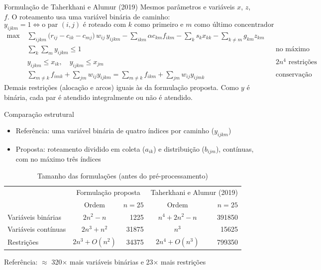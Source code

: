 \documentclass[aspectratio=169, 10pt]{beamer}
\begin{document}
\begin{frame}{Formulação de Taherkhani e Alumur (2019)}
  \small
  Mesmos parâmetros e variáveis $x$, $z$, $f$. O roteamento usa uma \alert{variável binária de caminho}:
  \[
    y_{ijkm} = 1 \iff \text{o par } (i,j) \text{ é roteado com } k \text{ como primeiro e } m \text{ como último concentrador}
  \]
  \vspace{-0.3cm}
  \scriptsize
  \begin{align*}
    \max\; & \textstyle\sum_{ijkm} \big(r_{ij} - c_{ik} - c_{mj}\big)\,w_{ij}\,y_{ijkm} - \sum_{ikm}\alpha c_{km}f_{ikm} - \sum_k s_kx_{kk} - \sum_{k\neq m} g_{km}z_{km}\\
    & \textstyle\sum_{k}\sum_m y_{ijkm}\le 1 && \text{no máximo um caminho por par}\\
    & y_{ijkm}\le x_{ik}, \quad y_{ijkm}\le x_{jm} && \text{$2n^4$ restrições}\\
    & \textstyle\sum_{m\neq k} f_{imk} + \sum_{jm} w_{ij}y_{ijkm} = \sum_{m\neq k} f_{ikm} + \sum_{jm} w_{ij}y_{ijmk} && \text{conservação de fluxo}
  \end{align*}
  \small
  \vspace{-0.2cm}
  Demais restrições (alocação e arcos) iguais às da formulação proposta. Como $y$ é binária, cada par é atendido \alert{integralmente ou não é atendido}.
\end{frame}

\begin{frame}{Comparação estrutural}
  \begin{itemize}
    \item Referência: \alert{uma variável binária de quatro índices} por caminho ($y_{ijkm}$)
    \item Proposta: roteamento dividido em coleta ($a_{ik}$) e distribuição ($b_{ijm}$), \alert{contínuas}, com no máximo três índices
  \end{itemize}

  \begin{table}
    \centering
    \footnotesize
    \caption{Tamanho das formulações (antes do pré-processamento)}
    \begin{tabular}{lcrcr}
      \toprule
       & \multicolumn{2}{c}{Formulação proposta} & \multicolumn{2}{c}{Taherkhani e Alumur (2019)}\\
       & Ordem & $n=25$ & Ordem & $n=25$\\
      \midrule
      Variáveis binárias & $2n^2-n$ & 1225 & $n^4+2n^2-n$ & 391850\\
      Variáveis contínuas & $2n^3+n^2$ & 31875 & $n^3$ & 15625\\
      Restrições & $2n^3+O(n^2)$ & 34375 & $2n^4+O(n^3)$ & 799350\\
      \bottomrule
    \end{tabular}
  \end{table}

  \begin{center}
    \small Referência: $\approx$ \alert{320$\times$ mais variáveis binárias} e \alert{23$\times$ mais restrições}
  \end{center}
\end{frame}
\end{document}
